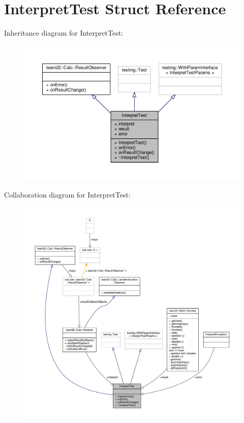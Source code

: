 \hypertarget{struct_interpret_test}{}\section{Interpret\+Test Struct Reference}
\label{struct_interpret_test}


Inheritance diagram for Interpret\+Test\+:
\nopagebreak
\begin{figure}[H]
\begin{center}
\leavevmode
\includegraphics[width=350pt]{struct_interpret_test__inherit__graph}
\end{center}
\end{figure}


Collaboration diagram for Interpret\+Test\+:
\nopagebreak
\begin{figure}[H]
\begin{center}
\leavevmode
\includegraphics[width=350pt]{struct_interpret_test__coll__graph}
\end{center}
\end{figure}
